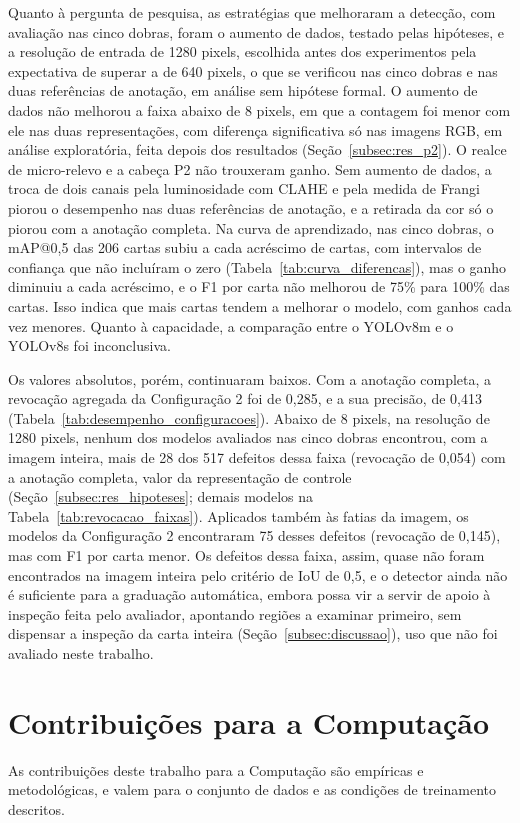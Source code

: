\documentclass[
    12pt,                %
    openright,           %
    oneside,             %
    a4paper,             %
    english,             %
    brazil               %
]{abntex2}
\begin{document}
Quanto à pergunta de pesquisa, as estratégias que melhoraram a
detecção, com avaliação nas cinco dobras, foram o aumento de dados,
testado pelas hipóteses, e a resolução de entrada de 1280 pixels,
escolhida antes dos experimentos pela expectativa de superar a de 640
pixels, o que se verificou nas cinco dobras e nas duas referências de
anotação, em análise sem hipótese formal.
O aumento de dados não melhorou a faixa abaixo de 8 pixels, em que a contagem foi menor com ele nas duas representações, com diferença significativa só nas imagens RGB, em
análise exploratória, feita depois dos resultados
(Seção~\ref{subsec:res_p2}). O realce de
micro-relevo e a cabeça P2 não trouxeram ganho. Sem aumento de dados, a
troca de dois canais pela luminosidade com CLAHE e pela medida de
Frangi piorou o desempenho nas duas referências de anotação, e a
retirada da cor só o piorou com a anotação completa. Na curva de aprendizado,
nas cinco dobras, o mAP@0,5 das 206 cartas subiu a cada acréscimo de
cartas, com intervalos de confiança que não incluíram o zero
(Tabela~\ref{tab:curva_diferencas}), mas o ganho diminuiu a cada
acréscimo, e o F1 por carta não melhorou de 75\% para 100\% das cartas.
Isso indica que mais cartas tendem a melhorar o modelo, com ganhos
cada vez menores. Quanto à capacidade, a comparação entre o YOLOv8m e o
YOLOv8s foi inconclusiva.

Os valores absolutos, porém, continuaram baixos. Com a anotação
completa, a revocação agregada da Configuração 2 foi de 0,285, e a sua
precisão, de 0,413 (Tabela~\ref{tab:desempenho_configuracoes}). Abaixo
de 8 pixels, na resolução de 1280 pixels, nenhum dos modelos avaliados
nas cinco dobras encontrou, com a imagem inteira, mais de 28 dos 517 defeitos dessa faixa
(revocação de 0,054) com a anotação completa, valor da representação
de controle (Seção~\ref{subsec:res_hipoteses}; demais modelos na Tabela~\ref{tab:revocacao_faixas}). Aplicados também às fatias da imagem, os modelos
da Configuração 2 encontraram 75 desses defeitos (revocação de 0,145),
mas com F1 por carta menor. Os defeitos dessa faixa, assim, quase não
foram encontrados na imagem inteira pelo critério de IoU de 0,5, e o detector ainda não é suficiente para a
graduação automática, embora possa vir a servir de apoio à inspeção
feita pelo avaliador, apontando regiões a examinar primeiro, sem
dispensar a inspeção da carta inteira (Seção~\ref{subsec:discussao}),
uso que não foi avaliado neste trabalho.

\section{Contribuições para a Computação}
\label{sec:contribuicoes}
As contribuições deste trabalho para a Computação são empíricas e
metodológicas, e valem para o conjunto de dados e as condições de
treinamento descritos.
\end{document}
